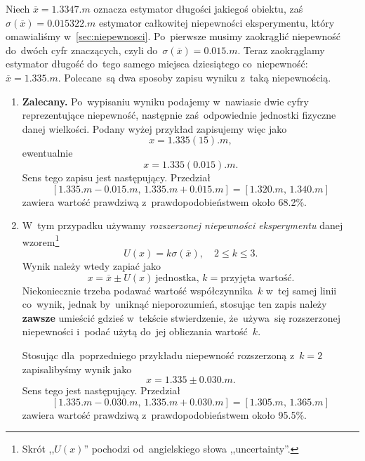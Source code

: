 \documentclass[a4paper,11pt]{article}
\newcommand{\tb}{\textbf}
\begin{document}
Niech $\overline{x} = 1.3347 \si{.m}$ oznacza estymator długości
jakiegoś obiektu, zaś $\sigma( \overline{x} ) = 0.015322 \si{.m}$
estymator całkowitej niepewności eksperymentu, który omawialiśmy
w~\eqref{sec:niepewnosci}. Po~pierwsze musimy zaokrąglić niepewność
do~dwóch cyfr znaczących, czyli
do~$\sigma( \overline{x} ) = 0.015 \si{.m}$. Teraz zaokrąglamy
estymator długość do~tego samego miejsca dziesiątego co~niepewność:
$\overline{x} = 1.335 \si{.m}$. Polecane~są dwa sposoby zapisu wyniku
z~taką niepewnością.
\begin{enumerate}
\item \tb{Zalecany.} Po~wypisaniu wyniku podajemy w~nawiasie dwie
  cyfry reprezentujące niepewność, następnie zaś~odpowiednie jednostki
  fizyczne danej wielkości. Podany wyżej przykład zapisujemy więc jako
  \begin{equation}
    \label{eq:8}
    x = 1.335(15) \si{.m},
  \end{equation}
  ewentualnie
  \begin{equation}
    \label{eq:9}
    x = 1.335(0.015) \si{.m}.
  \end{equation}
  Sens tego zapisu jest następujący. Przedział
  \begin{equation}
    \label{eq:10}
    [ 1.335 \si{.m} - 0.015 \si{.m},\, 1.335 \si{.m} + 0.015 \si{.m} ]
    = [ 1.320 \si{.m},\, 1.340 \si{.m} ]
  \end{equation}
  zawiera wartość prawdziwą z~prawdopodobieństwem około 68.2\%.
\item W~tym przypadku używamy \emph{rozszerzonej niepewności
    eksperymentu} danej wzorem\footnote{Skrót ,,$U( x )$'' pochodzi
    od~angielskiego słowa ,,uncertainty''.}
  \begin{equation}
    \label{eq:11}
    U( x ) = k \sigma( \overline{ x } ), \quad 2 \leq k \leq 3.
  \end{equation}
  Wynik należy wtedy zapiać jako
  \begin{equation}
    \label{eq:12}
    x = \overline{x} \pm U( x )\: \textrm{jednostka},\,
    k = \textrm{przyjęta wartość}.
  \end{equation}
  Niekoniecznie trzeba podawać wartość współczynnika~$k$ w~tej samej
  linii co~wynik, jednak by~uniknąć nieporozumień, stosując ten zapis
  należy \tb{zawsze} umieścić gdzieś w~tekście stwierdzenie,
  że~używa~się rozszerzonej niepewności i~podać użytą do~jej
  obliczania wartość~$k$.

  Stosując dla~poprzedniego przykładu niepewność rozszerzoną z~$k = 2$
  zapisalibyśmy wynik jako
  \begin{equation}
    \label{eq:13}
    x = 1.335 \pm 0.030 \si{.m}.
  \end{equation}
  Sens tego jest następujący. Przedział
  \begin{equation}
    \label{eq:14}
    [ 1.335 \si{.m} - 0.030 \si{.m},\, 1.335 \si{.m} + 0.030 \si{.m} ]
    = [ 1.305 \si{.m},\, 1.365 \si{.m} ]
  \end{equation}
  zawiera wartość prawdziwą z~prawdopodobieństwem około 95.5\%.


\end{enumerate}
\end{document}
